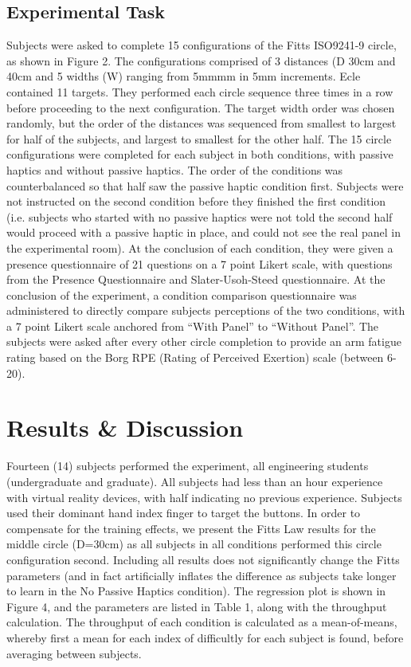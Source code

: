 \documentclass[]{aiaa-tc}%
\begin{document}
\subsection{Experimental Task}
Subjects were asked to complete 15 configurations of the Fitts ISO9241-9 circle, as shown in Figure 2.
The configurations comprised of 3 distances (D 30cm and 40cm and 5 widths (W) ranging from 5mmmm in 5mm increments.
Ecle contained 11 targets.
They performed each circle sequence three times in a row before proceeding to the next configuration.
The target width order was chosen randomly, but the order of the distances was sequenced from smallest to largest for half of the subjects, and largest to smallest for the other half.
The 15 circle configurations were completed for each subject in both conditions, with passive haptics and without passive haptics.
The order of the conditions was counterbalanced so that half saw the passive haptic condition first.
Subjects were not instructed on the second condition before they finished the first condition (i.e. subjects who started with no passive haptics were not told the second half would proceed with a passive haptic in place, and could not see the real panel in the experimental room).
At the conclusion of each condition, they were given a presence questionnaire of 21 questions on a 7 point Likert scale, with questions from the Presence Questionnaire and Slater-Usoh-Steed questionnaire.
At the conclusion of the experiment, a condition comparison questionnaire was administered to directly compare subjects perceptions of the two conditions, with a 7 point Likert scale anchored from ``With Panel'' to ``Without Panel''.
The subjects were asked after every other circle completion to provide an arm fatigue rating based on the Borg RPE (Rating of Perceived Exertion) scale (between 6-20).

\section{Results \& Discussion}
Fourteen (14) subjects performed the experiment, all engineering students (undergraduate and graduate).
All subjects had less than an hour experience with virtual reality devices, with half indicating no previous experience.
Subjects used their dominant hand index finger to target the buttons.
In order to compensate for the training effects, we present the Fitts Law results for the middle circle (D=30cm) as all subjects in all conditions performed this circle configuration second.
Including all results does not significantly change the Fitts parameters (and in fact artificially inflates the difference as subjects take longer to learn in the No Passive Haptics condition).
The regression plot is shown in Figure 4, and the parameters are listed in Table 1, along with the throughput calculation.
The throughput of each condition is calculated as a mean-of-means, whereby first a mean for each index of difficultly for each subject is found, before averaging between subjects.
\end{document}
